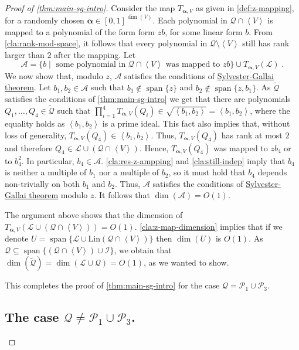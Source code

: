 \documentclass[10pt,a4paper]{article}
\newcommand{\vecalpha}{\boldsymbol{\alpha}}
\newcommand{\vaa}{{\vecalpha}}
\newcommand{\cA}{{\mathcal{A}}}
\newcommand{\cI}{{\mathcal{I}}}
\newcommand{\calL}{{\mathcal{L}}}
\newcommand{\cQ}{{\mathcal{Q}}}
\newcommand{\calP}{{\mathcal{P}}}
\newcommand{\ideal}[1]{\left \langle{#1}\right \rangle}
\newcommand{\spn}[1]{\operatorname{span}\{{#1}\}}
\newcommand{\MS}{\text{Lin}}
\begin{document}
\begin{proof}[Proof of \autoref{thm:main-sg-intro}]
Consider the map $T_{\vaa,V}$ as given in \autoref{def:z-mapping}, for a randomly chosen $\vaa\in[0,1]^{\dim(V)}$. Each polynomial in $\cQ\cap \ideal{V} $ is mapped to a polynomial of the form form $zb$, for some linear form $b$. From \autoref{cla:rank-mod-space}, it follows that every polynomial in $\cQ\setminus \ideal{V}$ still has rank larger than $2$ after the mapping.
Let $$\cA= \{b \mid \text{ some polynomial in } \cQ\cap \ideal{V}  \text{ was mapped to } zb\} \cup T_{\vaa,V}(\calL) \;.$$
We now show that, modulo $z$, $\cA$ satisfies the conditions of \hyperref[thm:SG-linforms]{Sylvester-Gallai theorem}.
Let $b_1,b_2\in\cA$ such that $b_1 \not\in\spn{z}$ and $b_2 \not\in\spn{z,b_1}$.
As $\tilde\cQ$ satisfies the conditions of \autoref{thm:main-sg-intro} we get that there are  polynomials $Q_1,\ldots,Q_4 \in \tilde\cQ$  such that $\prod_{i=1}^{4}T_{\vaa,V}(Q_i) \in \sqrt{\ideal{b_1,b_2}}=\ideal{b_1,b_2}$, where the equality holds as  $\ideal{b_1,b_2}$ is a prime ideal. This fact also implies that, without loss of generality,  $T_{\vaa,V}(Q_4)\in \ideal{b_1,b_2}$. Thus, $T_{\vaa,V}(Q_4)$ has rank at most $2$ and therefore $Q_4\in\calL\cup(\cQ\cap \ideal{V}) $. Hence, $T_{\vaa,V}(Q_4)$ was mapped to $zb_4$ or to $b_4^2$. In particular, $b_4\in\cA$. \autoref{cla:res-z-ampping} and \autoref{cla:still-indep} imply that $b_4$ is neither a multiple of $b_1$ nor a multiple of $b_2$, so it must hold that $b_4$ depends non-trivially on both $b_1$ and $b_2$. Thus, $\cA$ satisfies the conditions of \hyperref[thm:SG-linforms]{Sylvester-Gallai theorem} modulo $z$. It follows that $\dim(\cA)=O(1)$.

The argument above shows that the dimension of $T_{\vaa,V}(\calL\cup(\cQ\cap \ideal{V}) ) =O(1)$. \autoref{cla:z-map-dimension} implies that if we denote $U = \spn{\calL \cup \MS(\cQ\cap \ideal{V})}$ then  $\dim(U )$ is $O(1)$. As $\cQ \subseteq \spn{(\cQ\cap \ideal{V}) \cup \cI}$, we obtain that $\dim(\tilde\cQ)=\dim(\calL\cup \cQ) = O(1)$, as we wanted to show. 













This completes the proof of \autoref{thm:main-sg-intro} for the case $\cQ=\calP_1\cup\calP_3$.

\subsection{The case $\cQ\neq\calP_1\cup\calP_3$.}


\end{proof}
\end{document}
